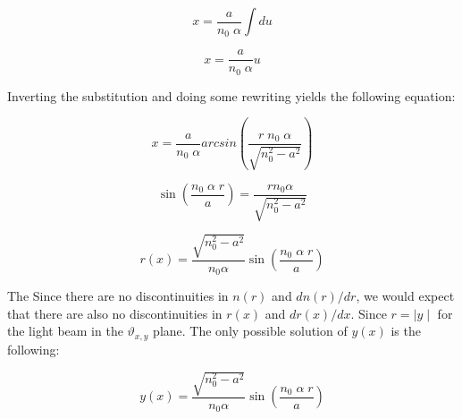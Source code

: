 \documentclass{article}
\begin{document}
\begin{equation}
	x = \frac{a}{n_0 \; \alpha} \int du
\end{equation}

\begin{equation}
	x = \frac{a}{n_0 \; \alpha} u
\end{equation}

Inverting the substitution and doing some rewriting yields the following equation:

\begin{equation}
	x = \frac{a}{n_0 \; \alpha} arcsin \left( \frac{r \; n_0 \; \alpha}{\sqrt{n_0^2-a^2}} \right)
\end{equation}

\begin{equation}
	\sin \left( \frac{n_0 \; \alpha \; r}{a} \right) =  \frac{r n_0 \alpha}{\sqrt{n_0^2-a^2}}
\end{equation}

\begin{equation}
	r(x) = \frac{\sqrt{n_0^2-a^2}}{n_0 \alpha} \sin \left( \frac{n_0 \; \alpha \; r}{a} \right) 
\end{equation}

The 
Since there are no discontinuities in $n(r)$ and $dn(r)/dr$, we would expect that there are also no discontinuities in $r(x)$ and $dr(x)/dx$. Since $r = \mid y \mid$ for the light beam in the $\vartheta _{x,y}$ plane. The only possible solution of $y(x)$ is the following:

\begin{equation}
	y(x) = \frac{\sqrt{n_0^2-a^2}}{n_0 \alpha} \sin \left( \frac{n_0 \; \alpha \; r}{a}\right) 
\end{equation}
\end{document}
